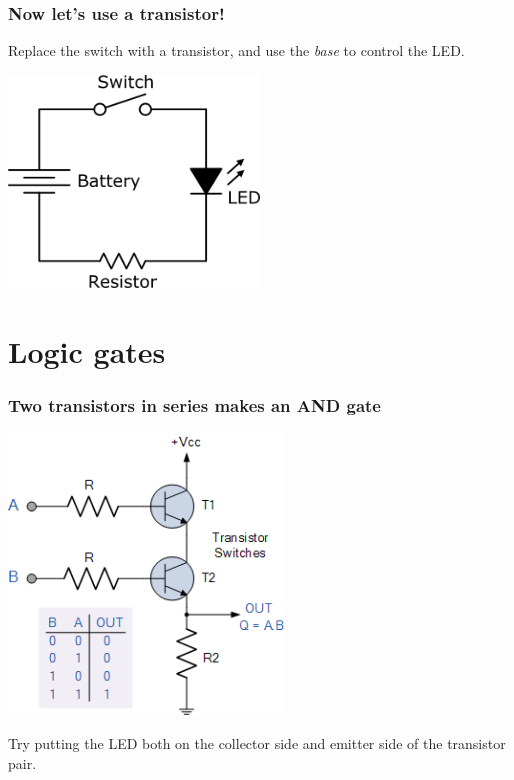 \documentclass{beamer}
\begin{document}
\begin{frame}
  \frametitle{Now let's use a transistor!}
  Replace the switch with a transistor, and use the \emph{base} to control the LED.

  \begin{center}
    \includegraphics[width=0.5\textwidth]{res/led-diagram.png}
  \end{center}
\end{frame}

\section{Logic gates}

\begin{frame}
  \frametitle{Two transistors in series makes an AND gate}

  \begin{center}
    \includegraphics[width=0.55\textwidth]{res/and-transistor.png}
  \end{center}

  Try putting the LED both on the collector side and emitter side of the
  transistor pair.
\end{frame}
\end{document}
